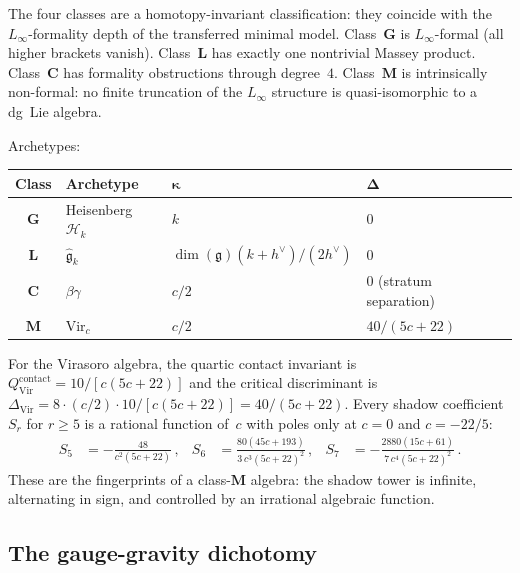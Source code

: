 \documentclass[11pt,reqno]{amsart}
\theoremstyle{definition}
\theoremstyle{remark}
\newcommand{\cH}{\mathcal{H}}
\newcommand{\fg}{\mathfrak{g}}
\newcommand{\Vir}{\mathrm{Vir}}
\numberwithin{equation}{section}
\begin{document}
The four classes are a homotopy-invariant classification:
they coincide with the $L_\infty$-formality depth of the
transferred minimal model. Class~$\mathbf{G}$ is
$L_\infty$-formal (all higher brackets vanish).
Class~$\mathbf{L}$ has exactly one nontrivial Massey
product. Class~$\mathbf{C}$ has formality obstructions
through degree~$4$. Class~$\mathbf{M}$ is intrinsically
non-formal: no finite truncation of the $L_\infty$
structure is quasi-isomorphic to a dg~Lie algebra.

Archetypes:
\begin{center}
\renewcommand{\arraystretch}{1.3}
\begin{tabular}{clll}
\toprule
\textbf{Class} & \textbf{Archetype}
 & $\boldsymbol{\kappa}$ & $\boldsymbol{\Delta}$ \\
\midrule
$\mathbf{G}$ & Heisenberg $\cH_k$
 & $k$ & $0$ \\
$\mathbf{L}$ & $\widehat{\fg}_k$
 & $\dim(\fg)(k{+}h^\vee)/(2h^\vee)$ & $0$ \\
$\mathbf{C}$ & $\beta\gamma$
 & $c/2$ & $0$ (stratum separation) \\
$\mathbf{M}$ & $\Vir_c$
 & $c/2$ & $40/(5c{+}22)$ \\
\bottomrule
\end{tabular}
\end{center}

For the Virasoro algebra, the quartic contact invariant is
$Q^{\mathrm{contact}}_{\Vir} = 10/[c(5c+22)]$ and the
critical discriminant is $\Delta_{\Vir} = 8 \cdot (c/2)
\cdot 10/[c(5c+22)] = 40/(5c+22)$. Every shadow
coefficient $S_r$ for $r \ge 5$ is a rational function
of~$c$ with poles only at $c = 0$ and $c = -22/5$:
\begin{align}
S_5 &= -\frac{48}{c^2(5c{+}22)}\,,
 &
S_6 &= \frac{80(45c{+}193)}{3\,c^3(5c{+}22)^2}\,,
 &
S_7 &= -\frac{2880(15c{+}61)}{7\,c^4(5c{+}22)^2}\,.
\label{eq:shadow-coefficients}
\end{align}
These are the fingerprints of a class-$\mathbf{M}$ algebra:
the shadow tower is infinite, alternating in sign, and
controlled by an irrational algebraic function.

\subsection{The gauge-gravity dichotomy}
\label{ssec:gauge-gravity}
\end{document}
